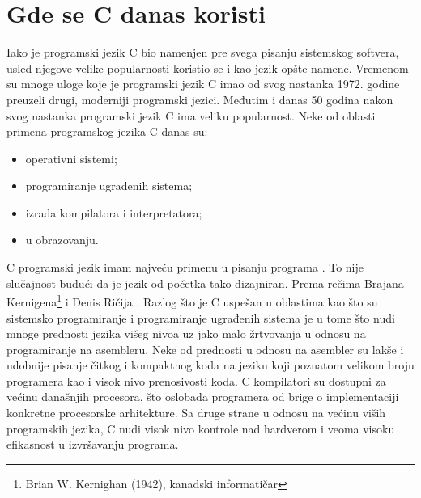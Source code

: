 \documentclass[a4paper]{article}
\begin{document}
{%

\section{Gde se C danas koristi}
Iako je programski jezik C bio namenjen pre svega pisanju sistemskog softvera, usled njegove velike popularnosti koristio se i kao jezik opšte namene. Vremenom su mnoge uloge koje je programski jezik C imao od svog nastanka 1972. godine preuzeli drugi, moderniji programski jezici. Međutim i danas 50 godina nakon svog nastanka programski jezik C ima veliku popularnost. Neke od oblasti primena programskog jezika C danas su:
\begin{itemize}
    \item operativni sistemi;
    \item programiranje ugrađenih sistema;
    \item izrada kompilatora i interpretatora;
    \item u obrazovanju.
\end{itemize}
C programski jezik imam najveću primenu u pisanju programa . To nije slučajnost budući da je jezik od početka tako dizajniran. Prema rečima Brajana Kernigena\footnote{Brian W. Kernighan (1942), kanadski informatičar} i Denis Ričija . Razlog što je C uspešan u oblastima kao što su sistemsko programiranje i programiranje ugrađenih sistema je u tome što nudi mnoge prednosti jezika višeg nivoa uz jako malo žrtvovanja u odnosu na programiranje na asembleru. Neke od prednosti u odnosu na asembler su lakše i udobnije pisanje čitkog i kompaktnog koda na jeziku koji poznatom velikom broju programera kao i visok nivo prenosivosti koda. C kompilatori su dostupni za većinu današnjih procesora, što oslobađa programera od brige o implementaciji konkretne procesorske arhitekture. Sa druge strane u odnosu na većinu viših programskih jezika, C nudi visok nivo kontrole nad hardverom i veoma visoku efikasnost u izvršavanju programa.

}
\end{document}
